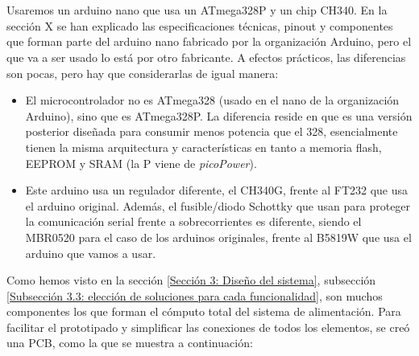 \documentclass[12pt]{article}
\begin{document}
	 \\
	
	 \\
	
	\noindent Usaremos un arduino nano que usa un ATmega328P y un chip CH340. En la sección X se han explicado las especificaciones técnicas, pinout y componentes que forman parte del arduino nano fabricado por la organización Arduino, pero el que va a ser usado lo está por otro fabricante. A efectos prácticos, las diferencias son pocas, pero hay que considerarlas de igual manera:
	
	\begin{itemize}
		\item El microcontrolador no es ATmega328 (usado en el nano de la organización Arduino), sino que es ATmega328P. La diferencia reside en que es una versión posterior diseñada para consumir menos potencia que el 328, esencialmente tienen la misma arquitectura y características en tanto a memoria flash, EEPROM y SRAM (la P viene de \textit{picoPower}).
		\item Este arduino usa un regulador diferente, el CH340G, frente al FT232 que usa el arduino original. Además, el fusible/diodo Schottky que usan para proteger la comunicación serial frente a sobrecorrientes es diferente, siendo el MBR0520 para el caso de los arduinos originales, frente al B5819W que usa el arduino que vamos a usar.
	\end{itemize}

	\noindent Como hemos visto en la sección \ref{Sección 3: Diseño del sistema}, subsección \ref{Subsección 3.3: elección de soluciones para cada funcionalidad}, son muchos componentes los que forman el cómputo total del sistema de alimentación. Para facilitar el prototipado y simplificar las conexiones de todos los elementos, se creó una PCB, como la que se muestra a continuación: \\
	
	 \\
	
\end{document}
